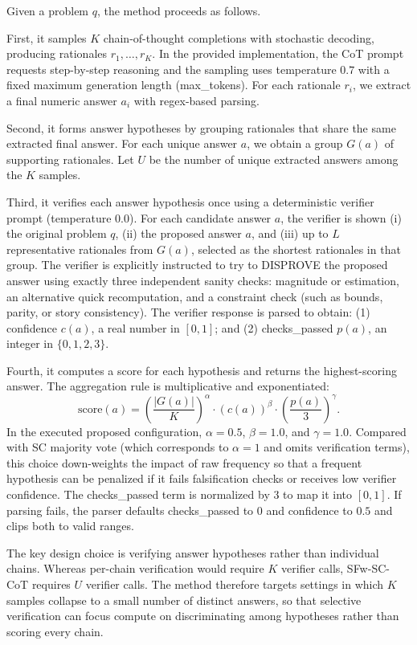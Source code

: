 \documentclass[journal,article,accept,pdftex,moreauthors]{Definitions/mdpi}
\begin{document}
Given a problem $q$, the method proceeds as follows.

First, it samples $K$ chain-of-thought completions with stochastic decoding, producing rationales $r_1,\ldots,r_K$. In the provided implementation, the CoT prompt requests step-by-step reasoning and the sampling uses temperature $0.7$ with a fixed maximum generation length (max\_tokens). For each rationale $r_i$, we extract a final numeric answer $a_i$ with regex-based parsing.

Second, it forms answer hypotheses by grouping rationales that share the same extracted final answer. For each unique answer $a$, we obtain a group $G(a)$ of supporting rationales. Let $U$ be the number of unique extracted answers among the $K$ samples.

Third, it verifies each answer hypothesis once using a deterministic verifier prompt (temperature $0.0$). For each candidate answer $a$, the verifier is shown (i) the original problem $q$, (ii) the proposed answer $a$, and (iii) up to $L$ representative rationales from $G(a)$, selected as the shortest rationales in that group. The verifier is explicitly instructed to try to DISPROVE the proposed answer using exactly three independent sanity checks: magnitude or estimation, an alternative quick recomputation, and a constraint check (such as bounds, parity, or story consistency). The verifier response is parsed to obtain: (1) confidence $c(a)$, a real number in $[0,1]$; and (2) checks\_passed $p(a)$, an integer in $\{0,1,2,3\}$.

Fourth, it computes a score for each hypothesis and returns the highest-scoring answer. The aggregation rule is multiplicative and exponentiated:
\[
\mathrm{score}(a) = {\left(\frac{|G(a)|}{K}\right)}^{{\alpha}} \cdot {\left(c(a)\right)}^{{\beta}} \cdot {\left(\frac{p(a)}{3}\right)}^{{\gamma}}.
\]
In the executed proposed configuration, $\alpha = 0.5$, $\beta = 1.0$, and $\gamma = 1.0$. Compared with SC majority vote (which corresponds to $\alpha = 1$ and omits verification terms), this choice down-weights the impact of raw frequency so that a frequent hypothesis can be penalized if it fails falsification checks or receives low verifier confidence. The checks\_passed term is normalized by $3$ to map it into $[0,1]$. If parsing fails, the parser defaults checks\_passed to $0$ and confidence to $0.5$ and clips both to valid ranges.

The key design choice is verifying answer hypotheses rather than individual chains. Whereas per-chain verification would require $K$ verifier calls, SFw-SC-CoT requires $U$ verifier calls. The method therefore targets settings in which $K$ samples collapse to a small number of distinct answers, so that selective verification can focus compute on discriminating among hypotheses rather than scoring every chain.
\end{document}
